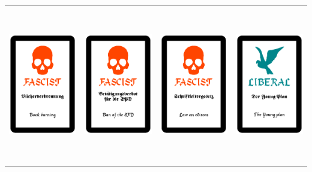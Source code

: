 \documentclass[12pt,a4paper,spanish]{article}
\begin{document}
\begin{table}
\begin{tabular}{|c|c|c|c|}
			\midrule
			\includegraphics[height=6.85cm]{./Drawings/fascist9.pdf} &
			\includegraphics[height=6.85cm]{./Drawings/fascist10.pdf} &
			\includegraphics[height=6.85cm]{./Drawings/fascist11.pdf} &
			\includegraphics[height=6.85cm]{./Drawings/liberal1.pdf} \\

\end{tabular}
\end{table}
\end{document}
